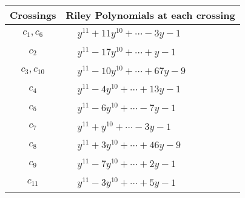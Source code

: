 \documentclass[1p]{elsarticle_modified}
\theoremstyle{definition}
\begin{document}
\begin{tabular}{m{50pt}|m{274pt}}
Crossings & \hspace{64pt}Riley Polynomials at each crossing \\
\hline $$\begin{aligned}c_{1},c_{6}\end{aligned}$$&$\begin{aligned}
&y^{11}+11 y^{10}+\cdots-3 y-1
\end{aligned}$\\
\hline $$\begin{aligned}c_{2}\end{aligned}$$&$\begin{aligned}
&y^{11}-17 y^{10}+\cdots+y-1
\end{aligned}$\\
\hline $$\begin{aligned}c_{3},c_{10}\end{aligned}$$&$\begin{aligned}
&y^{11}-10 y^{10}+\cdots+67 y-9
\end{aligned}$\\
\hline $$\begin{aligned}c_{4}\end{aligned}$$&$\begin{aligned}
&y^{11}-4 y^{10}+\cdots+13 y-1
\end{aligned}$\\
\hline $$\begin{aligned}c_{5}\end{aligned}$$&$\begin{aligned}
&y^{11}-6 y^{10}+\cdots-7 y-1
\end{aligned}$\\
\hline $$\begin{aligned}c_{7}\end{aligned}$$&$\begin{aligned}
&y^{11}+y^{10}+\cdots-3 y-1
\end{aligned}$\\
\hline $$\begin{aligned}c_{8}\end{aligned}$$&$\begin{aligned}
&y^{11}+3 y^{10}+\cdots+46 y-9
\end{aligned}$\\
\hline $$\begin{aligned}c_{9}\end{aligned}$$&$\begin{aligned}
&y^{11}-7 y^{10}+\cdots+2 y-1
\end{aligned}$\\
\hline $$\begin{aligned}c_{11}\end{aligned}$$&$\begin{aligned}
&y^{11}-3 y^{10}+\cdots+5 y-1
\end{aligned}$\\
\hline
\end{tabular}\\~\\
\end{document}

